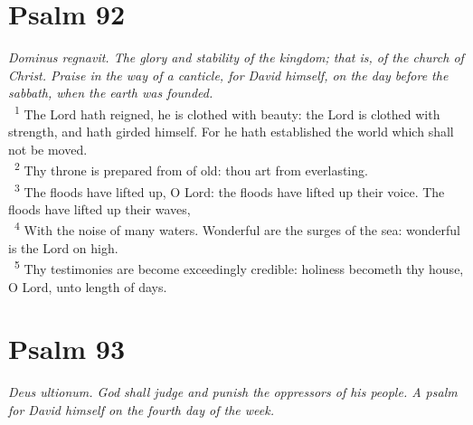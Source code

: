 \documentclass[a5paper,12pt]{article}
\begin{document}
\begin{multicols*}{2}
\section{Psalm 92}
\label{sec:orga1406ae}
\emph{Dominus regnavit. The glory and stability of the kingdom; that is, of the church of Christ. Praise in the way of a canticle, for David himself, on the day before the sabbath, when the earth was founded.}\\

~\textsuperscript{1} The Lord hath reigned, he is clothed with beauty: the Lord is clothed with strength, and hath girded himself. For he hath established the world which shall not be moved.\\
~\textsuperscript{2} Thy throne is prepared from of old: thou art from everlasting.\\
~\textsuperscript{3} The floods have lifted up, O Lord: the floods have lifted up their voice. The floods have lifted up their waves,\\
~\textsuperscript{4} With the noise of many waters. Wonderful are the surges of the sea: wonderful is the Lord on high.\\
~\textsuperscript{5} Thy testimonies are become exceedingly credible: holiness becometh thy house, O Lord, unto length of days.\\

\section{Psalm 93}
\label{sec:org89e6c80}
\emph{Deus ultionum. God shall judge and punish the oppressors of his people. A psalm for David himself on the fourth day of the week.}\\


\end{multicols*}
\end{document}
